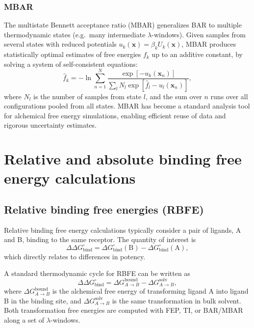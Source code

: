 \documentclass[12pt]{article}
\begin{document}
\subsubsection{MBAR}

The multistate Bennett acceptance ratio (MBAR) generalizes BAR to multiple thermodynamic states (e.g.\ many intermediate \(\lambda\)-windows).\cite{CH10_shirts2008mbar} 
Given samples from several states with reduced potentials \(u_k(\mathbf{x}) = \beta_k U_k(\mathbf{x})\), MBAR produces statistically optimal estimates of free energies \(f_k\) up to an additive constant, by solving a system of self-consistent equations:
\[
\hat{f}_k = -\ln \sum_{n=1}^{N} 
\frac{\exp\left[ -u_k(\mathbf{x}_n) \right]}
{\sum_{l} N_l \exp\left[ \hat{f}_l - u_l(\mathbf{x}_n) \right]},
\]
where \(N_l\) is the number of samples from state \(l\), and the sum over \(n\) runs over all configurations pooled from all states. 
MBAR has become a standard analysis tool for alchemical free energy simulations, enabling efficient reuse of data and rigorous uncertainty estimates.\cite{CH10_shirts2008mbar} 

\section{Relative and absolute binding free energy calculations}

\subsection{Relative binding free energies (RBFE)}

Relative binding free energy calculations typically consider a pair of ligands, A and B, binding to the same receptor. 
The quantity of interest is
\[
\Delta\Delta G^\circ_\mathrm{bind}
= \Delta G^\circ_\mathrm{bind}(\mathrm{B}) 
- \Delta G^\circ_\mathrm{bind}(\mathrm{A}),
\]
which directly relates to differences in potency. 

A standard thermodynamic cycle for RBFE can be written as
\[
\Delta\Delta G^\circ_\mathrm{bind}
= \Delta G_{A\to B}^{\mathrm{bound}} 
- \Delta G_{A\to B}^{\mathrm{solv}},
\]
where \(\Delta G_{A\to B}^{\mathrm{bound}}\) is the alchemical free energy of transforming ligand A into ligand B in the binding site, and \(\Delta G_{A\to B}^{\mathrm{solv}}\) is the same transformation in bulk solvent.\cite{CH10_wang2015accurate} 
Both transformation free energies are computed with FEP, TI, or BAR/MBAR along a set of \(\lambda\)-windows. 
\end{document}
